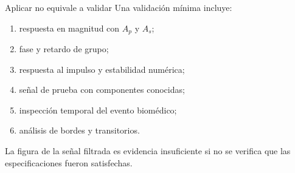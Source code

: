 \documentclass[
  ignorenonframetext,
  aspectratio=169,
  spanish,
  professionalfonts]{beamer}
\providecommand{\tightlist}{%
  \setlength{\itemsep}{0pt}\setlength{\parskip}{0pt}}
\begin{document}
\begin{frame}{Aplicar no equivale a validar}
\protect{}\label{aplicar-no-equivale-a-validar}
Una validación mínima incluye:

\begin{enumerate}
\tightlist
\item
  respuesta en magnitud con \(A_p\) y \(A_s\);
\item
  fase y retardo de grupo;
\item
  respuesta al impulso y estabilidad numérica;
\item
  señal de prueba con componentes conocidas;
\item
  inspección temporal del evento biomédico;
\item
  análisis de bordes y transitorios.
\end{enumerate}

\begin{tcolorbox}[enhanced jigsaw, arc=.35mm, bottomrule=.15mm, bottomtitle=1mm, breakable, colback=white, colbacktitle=quarto-callout-important-color!10!white, colframe=quarto-callout-important-color-frame, coltitle=black, left=2mm, leftrule=.75mm, opacityback=0, opacitybacktitle=0.6, rightrule=.15mm, title={Criterio}, titlerule=0mm, toprule=.15mm, toptitle=1mm]

La figura de la señal filtrada es evidencia insuficiente si no se
verifica que las especificaciones fueron satisfechas.

\end{tcolorbox}
\end{frame}
\end{document}
